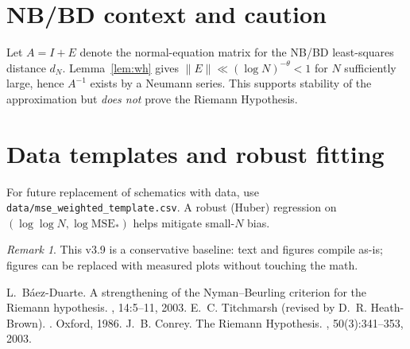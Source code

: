 \documentclass[11pt]{article}
\theoremstyle{remark}
\newtheorem{remark}{Remark}
\begin{document}
\section{NB/BD context and caution}
Let $A=I+E$ denote the normal-equation matrix for the NB/BD least-squares distance $d_N$. Lemma~\ref{lem:wh} gives $\|E\|\ll (\log N)^{-\theta}<1$ for $N$ sufficiently large, hence $A^{-1}$ exists by a Neumann series. This supports stability of the approximation but \emph{does not} prove the Riemann Hypothesis.

\appendix
\section{Data templates and robust fitting}
For future replacement of schematics with data, use \texttt{data/mse\_weighted\_template.csv}. A robust (Huber) regression on $(\log\log N,\log\mathrm{MSE}_\ast)$ helps mitigate small-$N$ bias.

\begin{remark}
This v3.9 is a conservative baseline: text and figures compile as-is; figures can be replaced with measured plots without touching the math.
\end{remark}


\begin{thebibliography}{10}
L.~B\'aez-Duarte.
\newblock A strengthening of the Nyman--Beurling criterion for the {R}iemann
  hypothesis.
, 14:5--11, 2003.
E.~C. Titchmarsh (revised by D.~R. Heath-Brown).
. Oxford, 1986.
J.~B. Conrey.
\newblock The Riemann Hypothesis.
, 50(3):341--353, 2003.
\end{thebibliography}
\end{document}

